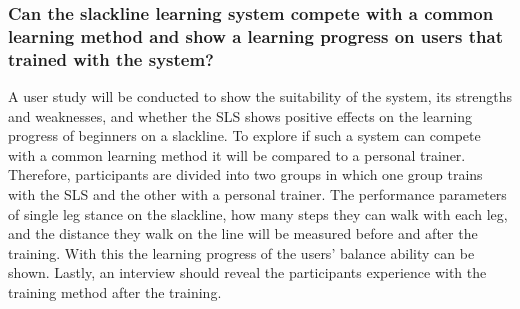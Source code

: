 \subsubsection{Can the slackline learning system compete with a common learning method and show a learning progress on users that trained with the system?}
A user study will be conducted to show the suitability of the system, its strengths and weaknesses, and whether the SLS shows positive effects on the learning progress of beginners on a slackline.
To explore if such a system can compete with a common learning method it will be compared to a personal trainer.
Therefore, participants are divided into two groups in which one group trains with the SLS and the other with a personal trainer.
The performance parameters of single leg stance on the slackline, how many steps they can walk with each leg, and the distance they walk on the line will be measured before and after the training.
With this the learning progress of the users' balance ability can be shown.
Lastly, an interview should reveal the participants experience with the training method after the training.



\begin{comment}
- Investigate related system

- Requirement analysis

- Conceptual design of an interactive feedback system for slacklining
-- Provide supportive feedback

- User interface design

- Integration

- Investigation of the system
\end{comment}
\begin{comment}

- Show if an interactive real time feedback system is usable for this kind of sport

- If the learning progress is comparable with other training methods like human trainer

- If such a system motivates user for slackline exercises
\end{comment}